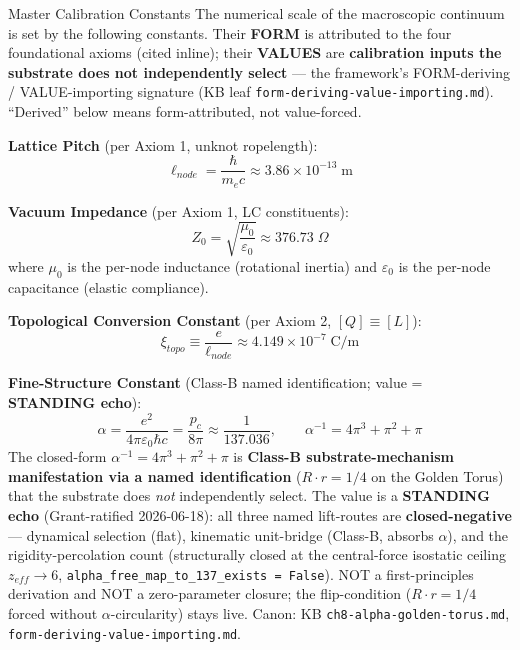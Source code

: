 \begin{resultbox}{Master Calibration Constants}
The numerical scale of the macroscopic continuum is set by the following constants.
Their \textbf{FORM} is attributed to the four foundational axioms (cited inline); their
\textbf{VALUES} are \textbf{calibration inputs the substrate does not independently
select} --- the framework's FORM-deriving / VALUE-importing signature (KB leaf
\texttt{form-deriving-value-importing.md}). ``Derived'' below means form-attributed,
not value-forced.

\medskip

\noindent\textbf{Lattice Pitch} (per Axiom 1, unknot ropelength):
\begin{equation}
    \ell_{node} = \frac{\hbar}{m_e c} \approx 3.86 \times 10^{-13}\;\text{m}
    \label{eq:cal_lnode}
\end{equation}

\noindent\textbf{Vacuum Impedance} (per Axiom 1, LC constituents):
\begin{equation}
    Z_0 = \sqrt{\frac{\mu_0}{\varepsilon_0}} \approx 376.73\;\Omega
    \label{eq:cal_z0}
\end{equation}
where $\mu_0$ is the per-node inductance (rotational inertia) and
$\varepsilon_0$ is the per-node capacitance (elastic compliance).

\noindent\textbf{Topological Conversion Constant} (per Axiom 2, $[Q]\equiv[L]$):
\begin{equation}
    \xi_{topo} \equiv \frac{e}{\ell_{node}} \approx 4.149 \times 10^{-7}\;\text{C/m}
    \label{eq:cal_xi_topo}
\end{equation}

\noindent\textbf{Fine-Structure Constant} (Class-B named identification; value = \textbf{STANDING echo}):
\begin{equation}
    \alpha = \frac{e^2}{4\pi\varepsilon_0\hbar c} = \frac{p_c}{8\pi} \approx \frac{1}{137.036}, \qquad
    \alpha^{-1} = 4\pi^3 + \pi^2 + \pi
    \label{eq:cal_alpha}
\end{equation}
The closed-form $\alpha^{-1} = 4\pi^3 + \pi^2 + \pi$ is \textbf{Class-B substrate-mechanism manifestation via a named identification} ($R\cdot r = 1/4$ on the Golden Torus) that the substrate does \emph{not} independently select. The value is a \textbf{STANDING echo} (Grant-ratified 2026-06-18): all three named lift-routes are \textbf{closed-negative} --- dynamical selection (flat), kinematic unit-bridge (Class-B, absorbs $\alpha$), and the rigidity-percolation count (structurally closed at the central-force isostatic ceiling $z_{eff} \to 6$, \texttt{alpha\_free\_map\_to\_137\_exists = False}). NOT a first-principles derivation and NOT a zero-parameter closure; the flip-condition ($R\cdot r = 1/4$ forced without $\alpha$-circularity) stays live. Canon: KB \texttt{ch8-alpha-golden-torus.md}, \texttt{form-deriving-value-importing.md}.


\end{resultbox}
